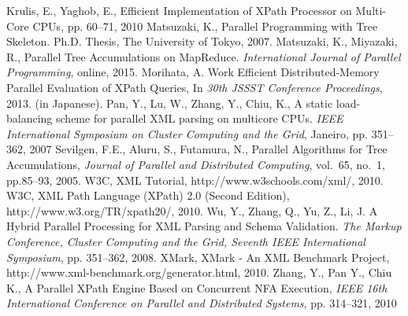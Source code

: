 \begin{thebibliography}{99}
Krulis, E., Yaghob, E., Efficient Implementation of 
XPath Processor on Multi-Core CPUs,  pp. 60--71, 
2010 
Matsuzaki, K., Parallel Programming with Tree Skeleton.
Ph.D. Thesis, The University of Tokyo, 2007.
Matsuzaki, K., Miyazaki, R., 
Parallel Tree Accumulations on MapReduce.
\emph{International Journal of Parallel Programming}, online, 2015.
Morihata, A. Work Efficient Distributed-Memory Parallel Evaluation of XPath Queries,
In \emph{30th JSSST Conference Proceedings}, 2013. (in Japanese).
Pan, Y., Lu, W., Zhang, Y., Chiu, K., A static 
load-balancing scheme for parallel XML parsing on 
multicore CPUs. \emph{IEEE International Symposium on 
Cluster Computing and the Grid}, Janeiro, pp. 
351--362, 2007 
Sevilgen, F.E., Aluru, S., Futamura, N., Parallel Algorithms for Tree Accumulations,
\emph{Journal of Parallel and Distributed Computing}, vol.~65, no.~1, pp.85--93, 2005.
W3C, XML Tutorial, http://www.w3schools.com/xml/, 2010. 
W3C, XML Path Language (XPath) 2.0 (Second 
Edition), http://www.w3.org/TR/xpath20/, 2010. 
Wu, Y., Zhang, Q., Yu, Z., Li, J. A Hybrid Parallel 
Processing for XML Parsing and Schema Validation. 
\emph{The Markup Conference, Cluster Computing and the 
Grid, Seventh IEEE International Symposium}, pp. 
351--362, 2008. 
XMark, XMark - An XML Benchmark Project, 
http://www.xml-benchmark.org/generator.html, 2010. 
Zhang, Y., Pan Y., Chiu K., A Parallel XPath Engine 
Based on Concurrent NFA Execution, \emph{IEEE 16th 
International Conference on Parallel and Distributed 
Systems}, pp. 314--321, 2010 
\end{thebibliography}
